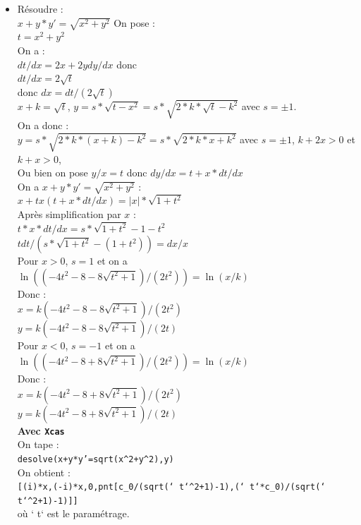 \documentclass[a4paper,11pt]{book}
\begin{document}
\begin{itemize}
\item  R\'esoudre :\\
$x+y*y'=\sqrt{x^2+y^2}$
On pose :\\
$t=x^2+y^2$\\
On a :\\
$dt/dx=2x+2ydy/dx$ donc\\
$dt/dx=2\sqrt t$\\
donc $dx=dt/(2\sqrt t)$\\
$x+k=\sqrt t$, $y=s*\sqrt{t-x^2}=s*\sqrt{2*k*\sqrt t-k^2}$ avec $s=\pm 1$.\\
On a donc :\\
$y=s*\sqrt{2*k*(x+k)-k^2}=s*\sqrt{2*k*x+k^2}$ avec $s=\pm 1$, $k+2x>0$ et 
$k+x>0$,\\

Ou bien on pose $y/x=t$ donc $dy/dx=t+x*dt/dx$\\
On a $x+y*y'=\sqrt{x^2+y^2}$ :\\
$x+tx(t+x*dt/dx)=|x|*\sqrt{1+t^2}$\\
Apr\`es simplification par $x$ :\\
$t*x*dt/dx=s*\sqrt{1+t^2}-1-t^2$\\
$tdt/(s*\sqrt{1+t^2}-(1+t^2))=dx/x$\\
Pour $x>0$, $s=1$ et on a\\
$\ln((-4t^2-8-8\sqrt{t^2+1})/(2t^2))=\ln(x/k)$\\
Donc :\\
$x=k(-4t^2-8-8\sqrt{t^2+1})/(2t^2)$\\
$y=k(-4t^2-8-8\sqrt{t^2+1})/(2t)$\\
Pour $x<0$, $s=-1$ et on a\\
$\ln((-4t^2-8+8\sqrt{t^2+1})/(2t^2))=\ln(x/k)$\\
Donc :\\
$x=k(-4t^2-8+8\sqrt{t^2+1})/(2t^2)$\\
$y=k(-4t^2-8+8\sqrt{t^2+1})/(2t)$\\


{\bf Avec {\tt Xcas}}\\
On tape :\\
{\tt desolve(x+y*y'=sqrt(x\verb|^|2+y\verb|^|2),y)}\\
On obtient :\\
{\tt [(i)*x,(-i)*x,0,pnt[c\_0/(sqrt(` t`\verb|^|2+1)-1),(` t`*c\_0)/(sqrt(` t`\verb|^|2+1)-1)]]}\\
o\`u ` t` est le param\'etrage. 
\end{itemize}
\end{document}

